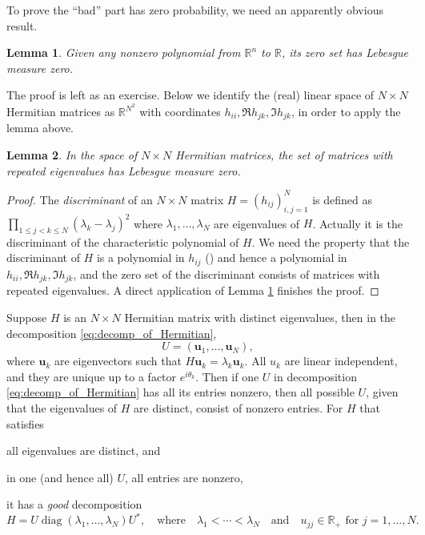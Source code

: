 \documentclass[11pt, a4paper]{article}
\numberwithin{equation}{section}
\newcommand{\realR}{\mathbb{R}}
\renewcommand{\vec}[1]{\mathbf{#1}}
\DeclareMathOperator{\diag}{diag}
\newtheorem{lem}{Lemma}
\theoremstyle{definition}
\theoremstyle{remark}
\begin{document}
To prove the ``bad'' part has zero probability, we need an apparently obvious result.
\begin{lem} \label{lem:variaety_measure_0}
  Given any nonzero polynomial from $\realR^n$ to $\realR$, its zero set has Lebesgue measure zero.
\end{lem}
The proof is left as an exercise. Below we identify the (real) linear space of $N \times N$ Hermitian matrices as $\realR^{N^2}$ with coordinates $h_{ii}, \Re h_{jk}, \Im h_{jk}$, in order to apply the lemma above.

\begin{lem} \label{lem:repeated_eigenvalues}
  In the space of $N \times N$ Hermitian matrices, the set of matrices with repeated eigenvalues has Lebesgue measure zero.
\end{lem}
\begin{proof}
  The \emph{discriminant} of an $N \times N$ matrix $H = (h_{ij})^N_{i, j = 1}$ is defined as $\prod_{1 \leq j < k \leq N} (\lambda_k - \lambda_j)^2$ where $\lambda_1, \dotsc, \lambda_N$ are eigenvalues of $H$. Actually it is the discriminant of the characteristic polynomial of $H$. We need the property that the discriminant of $H$ is a polynomial in $h_{ij}$ (\cite[Exercise 19 in Section 2]{Serre10}) and hence a polynomial in $h_{ii}, \Re h_{jk}, \Im h_{jk}$, and the zero set of the discriminant consists of matrices with repeated eigenvalues. A direct application of Lemma \ref{lem:variaety_measure_0} finishes the proof.
\end{proof}

Suppose $H$ is an $N \times N$ Hermitian matrix with distinct eigenvalues, then in the decomposition \eqref{eq:decomp_of_Hermitian},
\begin{equation}
  U = (\vec{u}_1, \dots, \vec{u}_N),
\end{equation}
where $\vec{u}_k$ are eigenvectors such that $H \vec{u}_k = \lambda_k \vec{u}_k$. All $u_k$ are linear independent, and they are unique up to a factor $e^{i\theta_k}$. Then if one $U$ in decomposition \eqref{eq:decomp_of_Hermitian} has all its entries nonzero, then all possible $U$, given that the eigenvalues of $H$ are distinct, consist of nonzero entries. For $H$ that satisfies
\begin{enumerate*}
\item 
  all eigenvalues are distinct, and
\item
  in one (and hence all) $U$, all entries are nonzero,
\end{enumerate*}
it has a \emph{good} decomposition
\begin{equation} \label{eq:decomp_for_good_Hermitian}
  H = U \diag(\lambda_1, \dotsc, \lambda_N) U^*, \quad \text{where} \quad \lambda_1 < \dotsb < \lambda_N \quad \text{and} \quad u_{jj} \in \realR_+ \text{ for $j = 1, \dotsc, N$}.
\end{equation}
\end{document}
